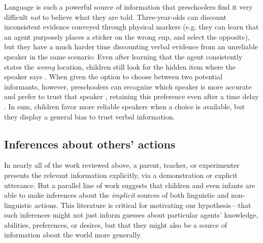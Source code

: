 \documentclass[man]{apa2}
\begin{document}
Language is such a powerful source of information that preschoolers find it very difficult \emph{not} to believe what they are told.  Three-year-olds can discount inconsistent evidence conveyed through physical markers (e.g. they can learn that an agent purposely places a sticker on the wrong cup, and select the opposite), but they have a much harder time discounting verbal evidence from an unreliable speaker in the same scenario: Even after learning that the agent consistently states the \emph{wrong} location, children still look for the hidden item where the speaker says \cite{jaswal2010}.  When given the option to choose between two potential informants, however, preschoolers can recognize which speaker is more accurate and prefer to trust that speaker \cite{pasquini2007}, retaining this preference even after a time delay \cite{corriveau2009}.  In sum, children favor more reliable speakers when a choice is available, but they display a general bias to trust verbal information.


\subsection{Inferences about others' actions}


In nearly all of the work reviewed above, a parent, teacher, or experimenter presents the relevant information explicitly, via a demonstration or explicit utterance. But a parallel line of work suggests that children and even infants are able to make inferences about the \emph{implicit} sources of both linguistic and non-linguistic actions. This literature is critical for motivating our hypothesis---that such inferences might not just inform guesses about particular agents' knowledge, abilities, preferences, or desires, but that they might also be a source of information about the world more generally. 

\end{document}
